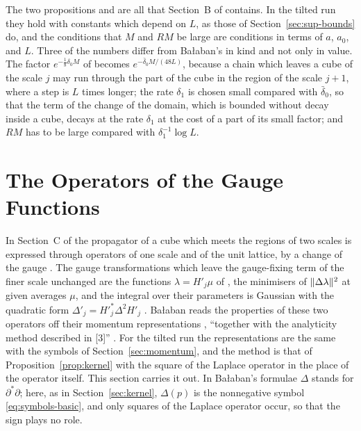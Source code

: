 \documentclass[11pt]{preprint}
\DeclarePairedDelimiter{\norm}{\lVert}{\rVert}
\numberwithin{equation}{section}
\theoremstyle{definition}
\theoremstyle{remark}
\theoremstyle{plain}
\begin{document}
The two propositions and \cite[(2.88)]{BalabanPRT2} are all that Section~B of \cite{BalabanPRT2} contains. In the tilted run they hold with constants which depend on $L$, as those of Section~\ref{sec:sup-bounds} do, and the conditions that $M$ and $RM$ be large are conditions in terms of $a$, $a_0$, and $L$. Three of the numbers differ from Ba{\l}aban's in kind and not only in value. The factor $e^{-\frac18\delta_0M}$ of \cite[(2.83)]{BalabanPRT2} becomes $e^{-\bar\delta_0M/(48L)}$, because a chain which leaves a cube of the scale $j$ may run through the part of the cube in the region of the scale $j + 1$, where a step is $L$ times longer; the rate $\delta_1$ is chosen small compared with $\bar\delta_0$, so that the term of the change of the domain, which is bounded without decay inside a cube, decays at the rate $\delta_1$ at the cost of a part of its small factor; and $RM$ has to be large compared with $\delta_1^{-1}\log L$.

\section{The Operators of the Gauge Functions}\label{sec:gauge-functions}

In Section~C of \cite{BalabanPRT2} the propagator of a cube which meets the regions of two scales is expressed through operators of one scale and of the unit lattice, by a change of the gauge \cite[(2.95)--(2.129), pp.~240--246]{BalabanPRT2}. The gauge transformations which leave the gauge-fixing term of the finer scale unchanged are the functions $\lambda = H'_j\mu$ of \cite[(2.101), p.~241]{BalabanPRT2}, the minimisers of $\norm{\Delta\lambda}^2$ at given averages $\mu$, and the integral over their parameters is Gaussian with the quadratic form $\Delta'_j = H'^*_j\Delta^2H'_j$ \cite[(2.107), p.~242]{BalabanPRT2}. Ba{\l}aban reads the properties of these two operators off their momentum representations \cite[(2.132), (2.108)]{BalabanPRT2}, ``together with the analyticity method described in [3]'' \cite[p.~246]{BalabanPRT2}. For the tilted run the representations are the same with the symbols of Section~\ref{sec:momentum}, and the method is that of Proposition~\ref{prop:kernel} with the square of the Laplace operator in the place of the operator itself. This section carries it out. In Ba{\l}aban's formulae $\Delta$ stands for $\partial^*\partial$; here, as in Section~\ref{sec:kernel}, $\Delta(p)$ is the nonnegative symbol \eqref{eq:symbols-basic}, and only squares of the Laplace operator occur, so that the sign plays no role.
\end{document}
